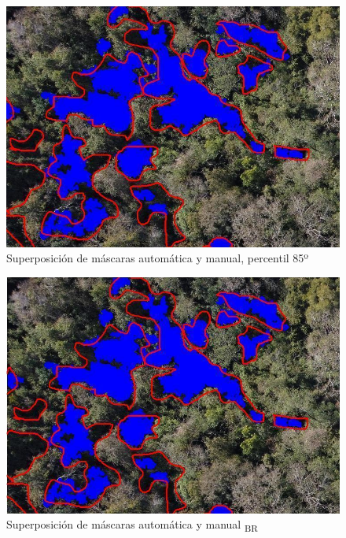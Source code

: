 \begin{figure}[H]
         
         \includegraphics[width=\textwidth]{Imagenes/superposition of masks 2.png}
         \caption{Superposición de máscaras automática y manual, percentil 85º}
         \label{p85}
\end{figure}

\begin{figure}[H]
    
    \includegraphics[width=\textwidth]{Imagenes/blue minus red 85.png}
     \hfill
     \caption{Superposición de máscaras automática y manual \textpsi\textsubscript{BR}}
    \label{azulrojo}
 \end{figure}

